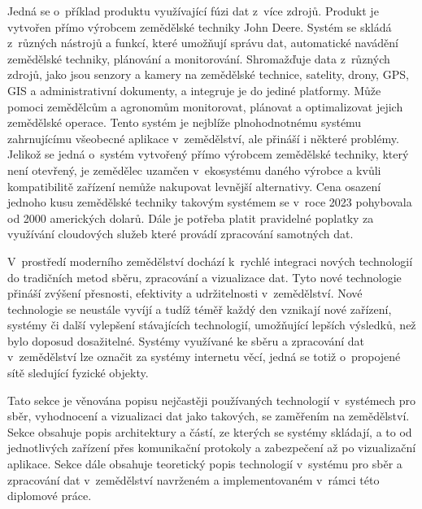 Jedná se o~příklad produktu využívající fúzi dat z~více zdrojů. Produkt je vytvořen přímo výrobcem zemědělské techniky John Deere. Systém se skládá z~různých nástrojů a funkcí, které umožňují správu dat, automatické navádění zemědělské techniky, plánování a monitorování. Shromažďuje data z~různých zdrojů, jako jsou senzory a kamery na zemědělské technice, satelity, drony, GPS, GIS a administrativní dokumenty, a integruje je do jediné platformy. Může pomoci zemědělcům a agronomům monitorovat, plánovat a optimalizovat jejich zemědělské operace. Tento systém je nejblíže plnohodnotnému systému zahrnujícímu všeobecné aplikace v~zemědělství, ale přináší i některé problémy. Jelikož se jedná o~systém vytvořený přímo výrobcem zemědělské techniky, který není otevřený, je zemědělec uzamčen v~ekosystému daného výrobce a kvůli kompatibilitě zařízení nemůže nakupovat levnější alternativy. Cena osazení jednoho kusu zemědělské techniky takovým systémem se v~roce 2023 pohybovala od 2000 amerických dolarů. Dále je potřeba platit pravidelné poplatky za využívání cloudových služeb které provádí zpracování samotných dat. \cite{JDEERE}

\label{sec:used_technologies}
V~prostředí moderního zemědělství dochází k~rychlé integraci nových technologií do tradičních metod sběru, zpracování a vizualizace dat. Tyto nové technologie přináší zvýšení přesnosti, efektivity a udržitelnosti v~zemědělství. Nové technologie se neustále vyvíjí a tudíž téměř každý den vznikají nové zařízení, systémy či další vylepšení stávajících technologií, umožňující lepších výsledků, než bylo doposud dosažitelné. Systémy využívané ke sběru a zpracování dat v~zemědělství lze označit za systémy internetu věcí, jedná se totiž o~propojené sítě sledující fyzické objekty.

Tato sekce je věnována popisu nejčastěji používaných technologií v~systémech pro sběr, vyhodnocení a vizualizaci dat jako takových, se zaměřením na zemědělství. Sekce obsahuje popis architektury a částí, ze kterých se systémy skládají, a to od jednotlivých zařízení přes komunikační protokoly a zabezpečení až po vizualizační aplikace. Sekce dále obsahuje teoretický popis technologií v~systému pro sběr a zpracování dat v~zemědělství navrženém a implementovaném v~rámci této diplomové práce.

